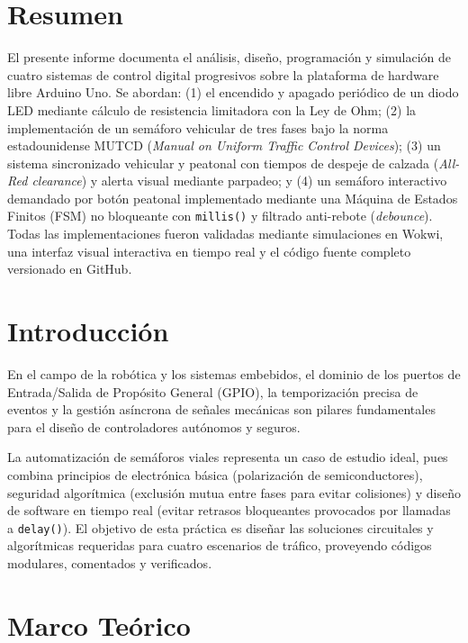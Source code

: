 \documentclass[12pt,a4paper]{article}
\begin{document}
\newpage

\section{Resumen}
El presente informe documenta el análisis, diseño, programación y simulación de cuatro sistemas de control digital progresivos sobre la plataforma de hardware libre Arduino Uno. Se abordan: (1) el encendido y apagado periódico de un diodo LED mediante cálculo de resistencia limitadora con la Ley de Ohm; (2) la implementación de un semáforo vehicular de tres fases bajo la norma estadounidense MUTCD (\textit{Manual on Uniform Traffic Control Devices}); (3) un sistema sincronizado vehicular y peatonal con tiempos de despeje de calzada (\textit{All-Red clearance}) y alerta visual mediante parpadeo; y (4) un semáforo interactivo demandado por botón peatonal implementado mediante una Máquina de Estados Finitos (FSM) no bloqueante con \texttt{millis()} y filtrado anti-rebote (\textit{debounce}). Todas las implementaciones fueron validadas mediante simulaciones en Wokwi, una interfaz visual interactiva en tiempo real y el código fuente completo versionado en GitHub.

\section{Introducción}
En el campo de la robótica y los sistemas embebidos, el dominio de los puertos de Entrada/Salida de Propósito General (GPIO), la temporización precisa de eventos y la gestión asíncrona de señales mecánicas son pilares fundamentales para el diseño de controladores autónomos y seguros. 

La automatización de semáforos viales representa un caso de estudio ideal, pues combina principios de electrónica básica (polarización de semiconductores), seguridad algorítmica (exclusión mutua entre fases para evitar colisiones) y diseño de software en tiempo real (evitar retrasos bloqueantes provocados por llamadas a \texttt{delay()}). El objetivo de esta práctica es diseñar las soluciones circuitales y algorítmicas requeridas para cuatro escenarios de tráfico, proveyendo códigos modulares, comentados y verificados.

\section{Marco Teórico}
\end{document}
